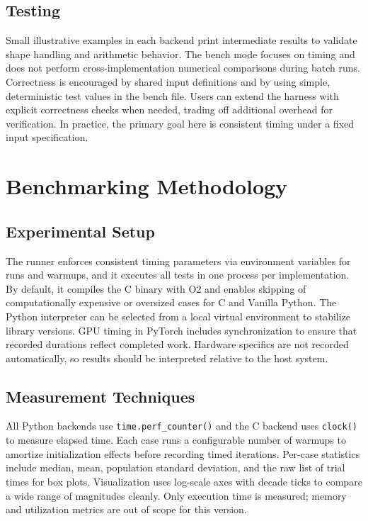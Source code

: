 \documentclass[a4paper,12pt]{article}
\begin{document}
\subsection{Testing}
Small illustrative examples in each backend print intermediate results to validate shape handling and arithmetic behavior. The bench mode focuses on timing and does not perform cross-implementation numerical comparisons during batch runs. Correctness is encouraged by shared input definitions and by using simple, deterministic test values in the bench file. Users can extend the harness with explicit correctness checks when needed, trading off additional overhead for verification. In practice, the primary goal here is consistent timing under a fixed input specification.

\section{Benchmarking Methodology}
\subsection{Experimental Setup}
The runner enforces consistent timing parameters via environment variables for runs and warmups, and it executes all tests in one process per implementation. By default, it compiles the C binary with O2 and enables skipping of computationally expensive or oversized cases for C and Vanilla Python. The Python interpreter can be selected from a local virtual environment to stabilize library versions. GPU timing in PyTorch includes synchronization to ensure that recorded durations reflect completed work. Hardware specifics are not recorded automatically, so results should be interpreted relative to the host system.

\subsection{Measurement Techniques}
All Python backends use \texttt{time.perf\_counter()} and the C backend uses \texttt{clock()} to measure elapsed time. Each case runs a configurable number of warmups to amortize initialization effects before recording timed iterations. Per-case statistics include median, mean, population standard deviation, and the raw list of trial times for box plots. Visualization uses log-scale axes with decade ticks to compare a wide range of magnitudes cleanly. Only execution time is measured; memory and utilization metrics are out of scope for this version.
\end{document}
